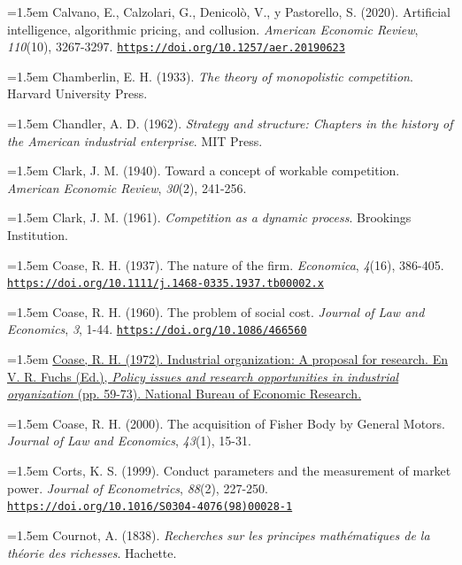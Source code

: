 \documentclass[10pt,a4paper]{article}
\begin{document}
\noindent\hangindent=1.5em Calvano, E., Calzolari, G., Denicolò, V., y Pastorello, S. (2020). Artificial intelligence, algorithmic pricing, and collusion. \textit{American Economic Review}, \textit{110}(10), 3267-3297. \href{https://doi.org/10.1257/aer.20190623}{\nolinkurl{https://doi.org/10.1257/aer.20190623}}

\noindent\hangindent=1.5em Chamberlin, E. H. (1933). \textit{The theory of monopolistic competition}. Harvard University Press.

\noindent\hangindent=1.5em Chandler, A. D. (1962). \textit{Strategy and structure: Chapters in the history of the American industrial enterprise}. MIT Press.

\noindent\hangindent=1.5em Clark, J. M. (1940). Toward a concept of workable competition. \textit{American Economic Review}, \textit{30}(2), 241-256.

\noindent\hangindent=1.5em Clark, J. M. (1961). \textit{Competition as a dynamic process}. Brookings Institution.

\noindent\hangindent=1.5em Coase, R. H. (1937). The nature of the firm. \textit{Economica}, \textit{4}(16), 386-405. \href{https://doi.org/10.1111/j.1468-0335.1937.tb00002.x}{\nolinkurl{https://doi.org/10.1111/j.1468-0335.1937.tb00002.x}}

\noindent\hangindent=1.5em Coase, R. H. (1960). The problem of social cost. \textit{Journal of Law and Economics}, \textit{3}, 1-44. \href{https://doi.org/10.1086/466560}{\nolinkurl{https://doi.org/10.1086/466560}}

\noindent\hangindent=1.5em \href{https://www.nber.org/chapters/c7618}{Coase, R. H. (1972). Industrial organization: A proposal for research. En V. R. Fuchs (Ed.), \textit{Policy issues and research opportunities in industrial organization} (pp. 59-73). National Bureau of Economic Research.}

\noindent\hangindent=1.5em Coase, R. H. (2000). The acquisition of Fisher Body by General Motors. \textit{Journal of Law and Economics}, \textit{43}(1), 15-31.

\noindent\hangindent=1.5em Corts, K. S. (1999). Conduct parameters and the measurement of market power. \textit{Journal of Econometrics}, \textit{88}(2), 227-250. \href{https://doi.org/10.1016/S0304-4076(98)00028-1}{\nolinkurl{https://doi.org/10.1016/S0304-4076(98)00028-1}}

\noindent\hangindent=1.5em Cournot, A. (1838). \textit{Recherches sur les principes mathématiques de la théorie des richesses}. Hachette.
\end{document}
